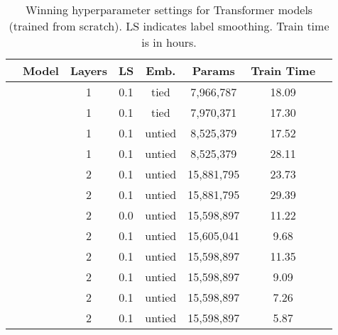 \begin{table*}
\center
\begin{tabular}{clccc ccc}
\toprule
&Model & Layers & LS & Emb. & Params & Train Time \\
\midrule
    \parbox[t]{2mm}{} 
 &  & 1 & 0.1 & tied & 7,966,787 & 18.09 \\
 &  & 1 & 0.1 & tied & 7,970,371 & 17.30 \\
 &  & 1 & 0.1 & untied & 8,525,379 & 17.52 \\
 &  & 1 & 0.1 & untied & 8,525,379 & 28.11 \\
 &  & 2 & 0.1 & untied & 15,881,795 & 23.73 \\
 &  & 2 & 0.1 & untied & 15,881,795 & 29.39 \\
\midrule
    \parbox[t]{2mm}{} 
 &  & 2 & 0.0 & untied & 15,598,897 & 11.22 \\
 &  & 2 & 0.1 & untied & 15,605,041 & 9.68 \\
 &  & 2 & 0.1 & untied & 15,598,897 & 11.35 \\
 &  & 2 & 0.1 & untied & 15,598,897 & 9.09 \\
 &  & 2 & 0.1 & untied & 15,598,897 &7.26 \\
 &  & 2 & 0.1 & untied & 15,598,897 &5.87 \\
\bottomrule
\end{tabular}

\caption{Winning hyperparameter settings for Transformer models (trained from scratch). LS indicates label smoothing. Train time is in hours.}
\label{tab:tfparams}
\end{table*}
